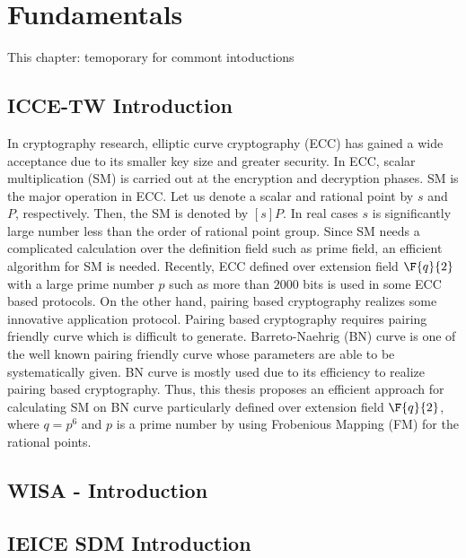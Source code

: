 \chapter{Fundamentals}
This chapter: temoporary for commont intoductions
\label{Chapter_intros}

\section{ICCE-TW Introduction}
In cryptography research, elliptic curve cryptography (ECC) has gained a wide acceptance due to its smaller key size and greater security. 
In ECC, scalar multiplication (SM) is carried out at the encryption and decryption phases. SM is the major operation in ECC. Let us denote a scalar and rational point by  $s$ and $P$, respectively. Then, the SM is denoted by $[s]P$. In real cases $s$ is significantly large number less than the order of rational point group. Since SM needs a complicated calculation over the definition field such as prime field, an efficient algorithm for SM is needed. Recently, ECC defined over extension field $\F{q}{2}$ with a large prime number $p$ such as more than $2000$ bits is used in some ECC based protocols. On the other hand, pairing based cryptography realizes some innovative application protocol. Pairing based cryptography requires pairing friendly curve which is difficult to generate. Barreto-Naehrig (BN) \cite{SAC:BarNae05} curve is one of the well known pairing friendly curve\cite{EPRINT:FreScoTes06} whose parameters are able to be systematically given. BN curve is mostly used due to its efficiency to realize pairing based cryptography. Thus, this thesis proposes an efficient approach for calculating SM on BN curve particularly defined over extension field $\F{q}{2}$, where $q=p^6$ and $p$ is a prime number by using Frobenious Mapping (FM) for the rational points.


\section{WISA - Introduction}


\section{IEICE SDM Introduction}

